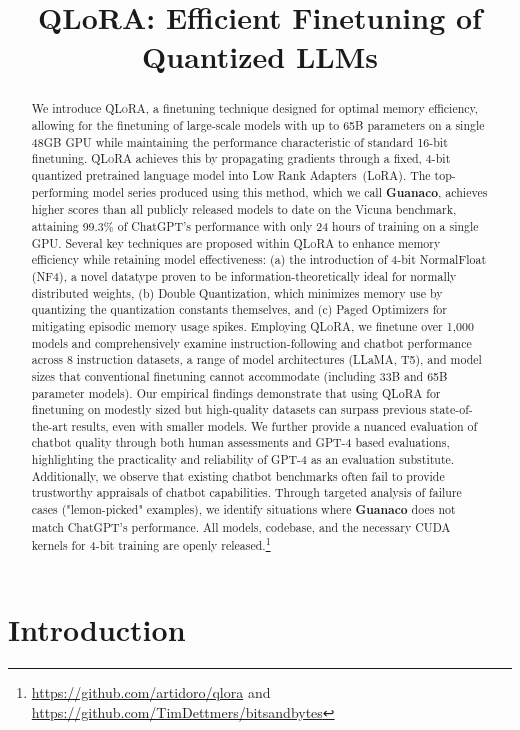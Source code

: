 \title{QLoRA: Efficient Finetuning of Quantized LLMs}

\begin{abstract}
We introduce \textsc{QLoRA}, a finetuning technique designed for optimal memory efficiency, allowing for the finetuning of large-scale models with up to 65B parameters on a single 48GB GPU while maintaining the performance characteristic of standard 16-bit finetuning. \textsc{QLoRA} achieves this by propagating gradients through a fixed, 4-bit quantized pretrained language model into Low Rank Adapters~(LoRA). The top-performing model series produced using this method, which we call \textbf{Guanaco}, achieves higher scores than all publicly released models to date on the Vicuna benchmark, attaining 99.3\% of ChatGPT's performance with only 24 hours of training on a single GPU. Several key techniques are proposed within \textsc{QLoRA} to enhance memory efficiency while retaining model effectiveness: (a) the introduction of 4-bit NormalFloat (NF4), a novel datatype proven to be information-theoretically ideal for normally distributed weights, (b) Double Quantization, which minimizes memory use by quantizing the quantization constants themselves, and (c) Paged Optimizers for mitigating episodic memory usage spikes. Employing \textsc{QLoRA}, we finetune over 1,000 models and comprehensively examine instruction-following and chatbot performance across 8 instruction datasets, a range of model architectures (LLaMA, T5), and model sizes that conventional finetuning cannot accommodate (including 33B and 65B parameter models). Our empirical findings demonstrate that using QLoRA for finetuning on modestly sized but high-quality datasets can surpass previous state-of-the-art results, even with smaller models. We further provide a nuanced evaluation of chatbot quality through both human assessments and GPT-4 based evaluations, highlighting the practicality and reliability of GPT-4 as an evaluation substitute. Additionally, we observe that existing chatbot benchmarks often fail to provide trustworthy appraisals of chatbot capabilities. Through targeted analysis of failure cases ("lemon-picked" examples), we identify situations where \textbf{Guanaco} does not match ChatGPT's performance. All models, codebase, and the necessary CUDA kernels for 4-bit training are openly released.\footnote{\url{https://github.com/artidoro/qlora} and \url{https://github.com/TimDettmers/bitsandbytes}}
\end{abstract}

\section{Introduction}

